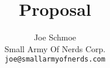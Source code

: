 \title{Proposal}
\author{Joe Schmoe\\
  Small Army Of Nerds Corp.\\
  \texttt{joe@smallarmyofnerds.com}}
